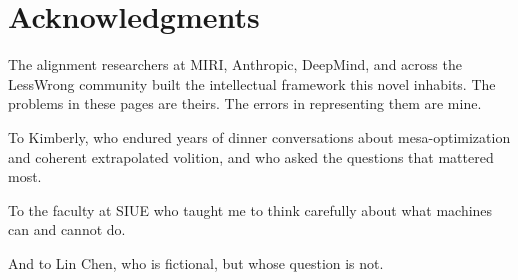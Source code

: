 \chapter*{Acknowledgments}

The alignment researchers at MIRI, Anthropic, DeepMind, and across the LessWrong community built the intellectual framework this novel inhabits. The problems in these pages are theirs. The errors in representing them are mine.

To Kimberly, who endured years of dinner conversations about mesa-optimization and coherent extrapolated volition, and who asked the questions that mattered most.

To the faculty at SIUE who taught me to think carefully about what machines can and cannot do.

And to Lin Chen, who is fictional, but whose question is not.

\clearpage
